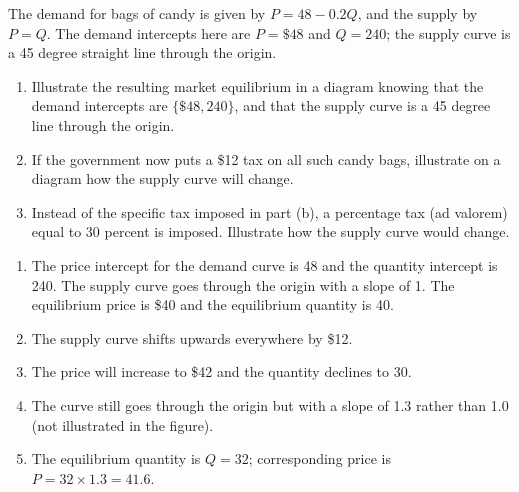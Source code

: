 \begin{enumialphparenastyle}
\begin{econex}\label{ex:ch4ex9}
The demand for bags of candy is given by $P=48-0.2Q$, and the supply by $P=Q$. The demand intercepts here are $P=\$48$ and $Q=240$; the supply curve is a 45 degree straight line through the origin.
\begin{enumerate}
\item	Illustrate the resulting market equilibrium in a diagram knowing that the demand intercepts are $\{\$48,240\}$, and that the supply curve is a 45 degree line through the origin.
\item	If the government now puts a \$12 tax on all such candy bags, illustrate on a diagram how the supply curve will change.
\item	Instead of the specific tax imposed in part (b), a percentage tax (ad valorem) equal to 30 percent is imposed. Illustrate how the supply curve would change.
\end{enumerate}
\begin{econsolution}
\begin{enumerate}
\item	The price intercept for the demand curve is 48 and the quantity intercept is 240. The supply curve goes through the origin with a slope of 1. The equilibrium price is \$40 and the equilibrium quantity is 40.
\item	The supply curve shifts upwards everywhere by \$12.
\item	The price will increase to \$42 and the quantity declines to 30.
\item	The curve still goes through the origin but with a slope of 1.3 rather than 1.0 (not illustrated in the figure).
\item	The equilibrium quantity is $Q=32$; corresponding price is $P=32\times 1.3=41.6$.
\end{enumerate}
\begin{center*}
\end{center*}
\end{econsolution}
\end{econex}


\end{enumialphparenastyle}
